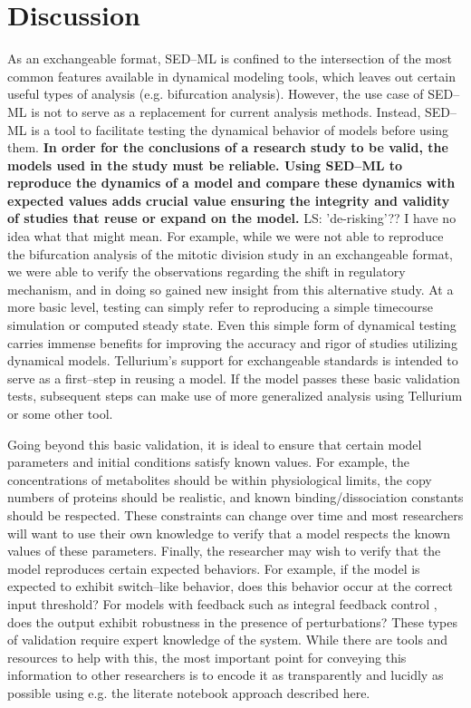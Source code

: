\documentclass[10pt,letterpaper]{article}
\begin{document}
\section*{Discussion}

As an exchangeable format, SED--ML is confined to the intersection of the most common features available in dynamical modeling tools, which leaves out certain useful types of analysis (e.g. bifurcation analysis). However, the use case of SED--ML is not to serve as a replacement for current analysis methods. Instead, SED--ML is a tool to facilitate testing the dynamical behavior of models before using them. \textbf{In order for the conclusions of a research study to be valid, the models used in the study must be reliable. Using SED--ML to reproduce the dynamics of a model and compare these dynamics with expected values adds crucial value ensuring the integrity and validity of studies that reuse or expand on the model.} {\color{green} LS: 'de-risking'??  I have no idea what that might mean.} For example, while we were not able to reproduce the bifurcation analysis of the mitotic division study \cite{calzone2007dynamical} in an exchangeable format, we were able to verify the observations regarding the shift in regulatory mechanism, and in doing so gained new insight from this alternative study. At a more basic level, testing can simply refer to reproducing a simple timecourse simulation or computed steady state.
Even this simple form of dynamical testing carries immense benefits for improving the accuracy and rigor of studies utilizing dynamical models. Tellurium's support for exchangeable standards is intended to serve as a first--step in reusing a model. If the model passes these basic validation tests, subsequent steps can make use of more generalized analysis using Tellurium or some other tool.

Going beyond this basic validation, it is ideal to ensure that certain model parameters and initial conditions satisfy known values. For example, the concentrations of metabolites should be within physiological limits, the copy numbers of proteins should be realistic, and known binding/dissociation constants should be respected. These constraints can change over time and most researchers will want to use their own knowledge to verify that a model respects the known values of these parameters. Finally, the researcher may wish to verify that the model reproduces certain expected behaviors. For example, if the model is expected to exhibit switch--like behavior, does this behavior occur at the correct input threshold? For models with feedback such as integral feedback control \cite{briat2016antithetic}, does the output exhibit robustness in the presence of perturbations? These types of validation require expert knowledge of the system. While there are tools and resources to help with this, the most important point for conveying this information to other researchers is to encode it as transparently and lucidly as possible using e.g. the literate notebook approach described here.
\end{document}
